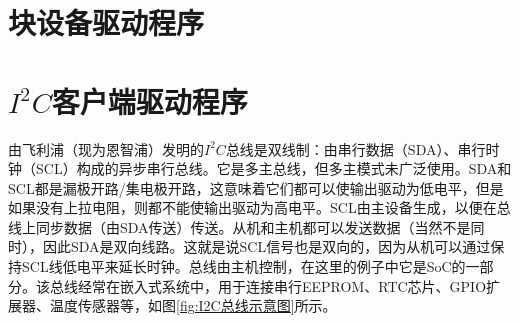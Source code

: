 \documentclass[lang=cn,newtx,10pt,scheme=chinese]{elegantbook}
\begin{document}
\chapter{块设备驱动程序}

\chapter{\texorpdfstring{$I^2C$客户端驱动程序}{I2C客户端驱动程序}}

由飞利浦（现为恩智浦）发明的$I^2C$总线是双线制：由串行数据（SDA）、串行时钟（SCL）构成的异步串行总线。它是多主总线，但多主模式未广泛使用。SDA和SCL都是漏极开路/集电极开路，这意味着它们都可以使输出驱动为低电平，但是如果没有上拉电阻，则都不能使输出驱动为高电平。SCL由主设备生成，以便在总线上同步数据（由SDA传送）传送。从机和主机都可以发送数据（当然不是同时），因此SDA是双向线路。这就是说SCL信号也是双向的，因为从机可以通过保持SCL线低电平来延长时钟。总线由主机控制，在这里的例子中它是SoC的一部分。该总线经常在嵌入式系统中，用于连接串行EEPROM、RTC芯片、GPIO扩展器、温度传感器等，如图\ref{fig:I2C总线示意图}所示。
\end{document}
